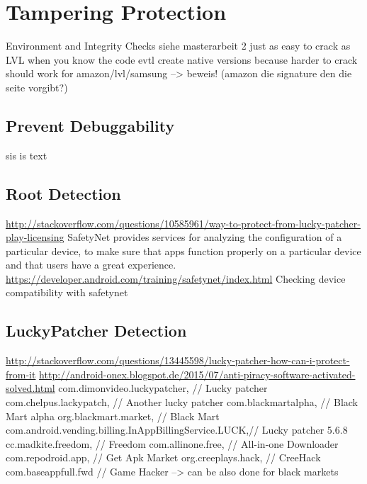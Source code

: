 \section{Tampering Protection}\label{section:tampering}
Environment and Integrity Checks\newline
siehe masterarbeit 2\newline
just as easy to crack as LVL when you know the code\newline
evtl create native versions because harder to crack\newline
should work for amazon/lvl/samsung --> beweis! (amazon die signature den die seite vorgibt?)\newline


\subsection{Prevent Debuggability}\label{subsection:tampering-debuggable}
sis is text
\subsection{Root Detection}\label{subsection:tampering-root}
\url{http://stackoverflow.com/questions/10585961/way-to-protect-from-lucky-patcher-play-licensing}\newline
SafetyNet provides services for analyzing the configuration of a particular device, to make sure that apps function properly on a particular device and that users have a great experience. \url{https://developer.android.com/training/safetynet/index.html} Checking device compatibility with safetynet\newline
\subsection{LuckyPatcher Detection}\label{subsection:tampering-luckypatcher}
\url{http://stackoverflow.com/questions/13445598/lucky-patcher-how-can-i-protect-from-it}\newline
\url{http://android-onex.blogspot.de/2015/07/anti-piracy-software-activated-solved.html}\newline
com.dimonvideo.luckypatcher, // Lucky patcher\newline
com.chelpus.lackypatch, // Another lucky patcher\newline
com.blackmartalpha, // Black Mart alpha\newline
org.blackmart.market, // Black Mart\newline
com.android.vending.billing.InAppBillingService.LUCK,// Lucky patcher 5.6.8\newline
cc.madkite.freedom, // Freedom\newline
com.allinone.free, // All-in-one Downloader\newline
com.repodroid.app, // Get Apk Market\newline
org.creeplays.hack, // CreeHack\newline
com.baseappfull.fwd // Game Hacker\newline
--> can be also done for black markets\newline


